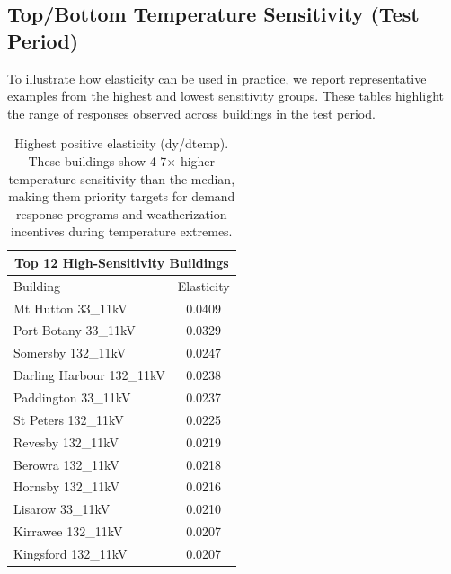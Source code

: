 \documentclass[11pt,a4paper]{article}
\begin{document}
\subsection{Top/Bottom Temperature Sensitivity (Test Period)}

To illustrate how elasticity can be used in practice, we report representative examples from the highest and lowest sensitivity groups. These tables highlight the range of responses observed across buildings in the test period.

\begin{table}[H]
  \centering
  \begin{tabular}{l c}
    \hline
    \multicolumn{2}{c}{Top 12 High-Sensitivity Buildings} \\ \hline
    Building & Elasticity \\ \hline
    Mt Hutton 33\_11kV & 0.0409 \\
    Port Botany 33\_11kV & 0.0329 \\
    Somersby 132\_11kV & 0.0247 \\
    Darling Harbour 132\_11kV & 0.0238 \\
    Paddington 33\_11kV & 0.0237 \\
    St Peters 132\_11kV & 0.0225 \\
    Revesby 132\_11kV & 0.0219 \\
    Berowra 132\_11kV & 0.0218 \\
    Hornsby 132\_11kV & 0.0216 \\
    Lisarow 33\_11kV & 0.0210 \\
    Kirrawee 132\_11kV & 0.0207 \\
    Kingsford 132\_11kV & 0.0207 \\
    \hline
  \end{tabular}
  \caption{Highest positive elasticity (dy/dtemp). These buildings show 4-7$\times$ higher temperature sensitivity than the median, making them priority targets for demand response programs and weatherization incentives during temperature extremes.}
\end{table}
\end{document}
